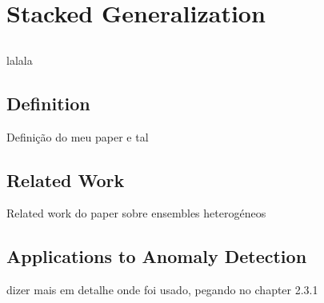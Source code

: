 \chapter{Stacked Generalization} \label{chap:stacking}

\section*{}

lalala

\section{Definition}

Definição do meu paper e tal

\section{Related Work}

Related work do paper sobre ensembles heterogéneos

\section{Applications to Anomaly Detection}

dizer mais em detalhe onde foi usado, pegando no chapter 2.3.1